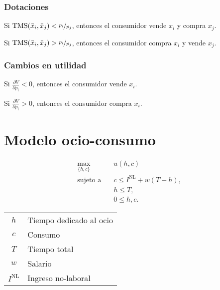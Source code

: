 \documentclass[8pt,a4paper]{extarticle}
\begin{document}
\begin{multicols}{3}
	\subsubsection*{Dotaciones}

	\begin{eqlist}
		\item Si $\text{TMS} (\bar{x}_i, \bar{x}_j) < \nicefrac{p_i}{p_j}$, entonces el consumidor vende $x_i$ y compra $x_j$.
		\item Si $\text{TMS} (\bar{x}_i, \bar{x}_j) > \nicefrac{p_i}{p_j}$, entonces el consumidor compra $x_i$ y vende $x_j$.
	\end{eqlist}

	\subsubsection*{Cambios en utilidad}

	\begin{eqlist}
		\item Si $\displaystyle \frac{\partial V}{\partial p_i} < 0$, entonces el consumidor vende $x_i$.
		\item Si $\displaystyle \frac{\partial V}{\partial p_i} > 0$, entonces el consumidor compra $x_i$.
	\end{eqlist}

	\newpage

	\section{Modelo ocio-consumo}

	\begin{equation*}
		\begin{aligned}
			\max_{\{h, c\}}\	      & u(h, c)                         \\
			\text{sujeto a} \quad & c \le I^{\text{NL}} + w(T - h), \\
			                      & h \le T,                        \\
			                      & 0 \le h, c.
		\end{aligned}
	\end{equation*}

	\begin{center}
		\begin{tabular}{ c l }
			\hline
			$h$             & Tiempo dedicado al ocio \\
			$c$             & Consumo                 \\
			$T$             & Tiempo total            \\
			$w$             & Salario                 \\
			$I^{\text{NL}}$ & Ingreso no-laboral      \\
			\hline
		\end{tabular}
	\end{center}


\end{multicols}
\end{document}
